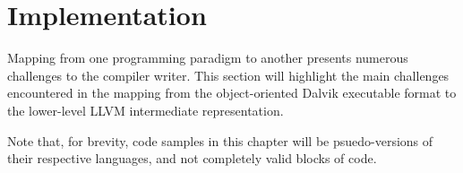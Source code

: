 \chapter{Implementation}
\label{chap:implementation}

Mapping from one programming paradigm to another presents numerous challenges to the compiler writer. This section will highlight the main challenges encountered in the mapping from the object-oriented Dalvik executable format to the lower-level LLVM intermediate representation.

Note that, for brevity, code samples in this chapter will be psuedo-versions of their respective languages, and not completely valid blocks of code.















%

%

%
